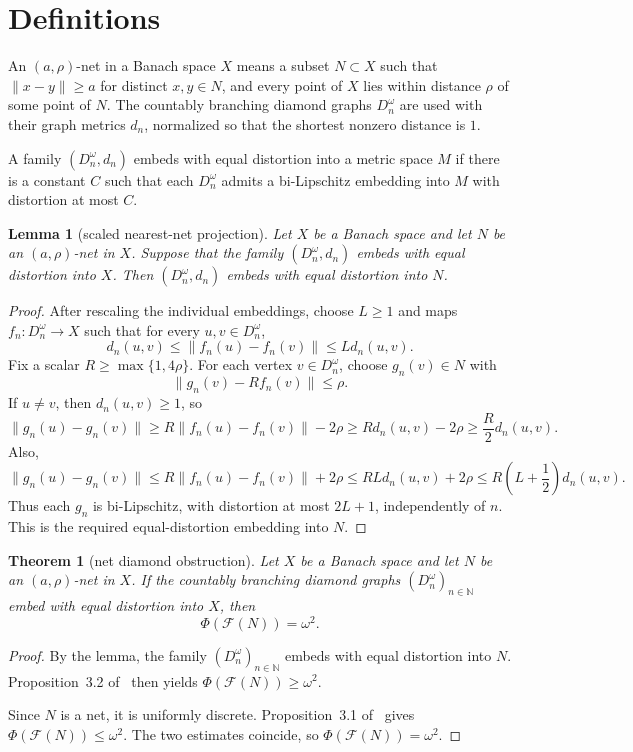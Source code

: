 \documentclass[11pt]{article}
\newtheorem{theorem}{Theorem}
\newtheorem{lemma}{Lemma}
\newcommand{\F}{\mathcal F}
\newcommand{\N}{\mathbb N}
\begin{document}
\section*{Definitions}

An $(a,\rho)$-net in a Banach space $X$ means a subset $N\subset X$ such that
$\|x-y\|\geq a$ for distinct $x,y\in N$, and every point of $X$ lies within
distance $\rho$ of some point of $N$.  The countably branching diamond graphs
$D_n^\omega$ are used with their graph metrics $d_n$, normalized so that the
shortest nonzero distance is $1$.

A family $(D_n^\omega,d_n)$ embeds with equal distortion into a metric space
$M$ if there is a constant $C$ such that each $D_n^\omega$ admits a
bi-Lipschitz embedding into $M$ with distortion at most $C$.

\begin{lemma}[scaled nearest-net projection]
Let $X$ be a Banach space and let $N$ be an $(a,\rho)$-net in $X$.  Suppose
that the family $(D_n^\omega,d_n)$ embeds with equal distortion into $X$.
Then $(D_n^\omega,d_n)$ embeds with equal distortion into $N$.
\end{lemma}

\begin{proof}
After rescaling the individual embeddings, choose $L\geq 1$ and maps
$f_n:D_n^\omega\to X$ such that for every $u,v\in D_n^\omega$,
\[
        d_n(u,v)\leq \|f_n(u)-f_n(v)\|\leq Ld_n(u,v).
\]
Fix a scalar $R\geq \max\{1,4\rho\}$.  For each vertex $v\in D_n^\omega$,
choose $g_n(v)\in N$ with
\[
        \|g_n(v)-R f_n(v)\|\leq \rho .
\]
If $u\neq v$, then $d_n(u,v)\geq 1$, so
\[
 \|g_n(u)-g_n(v)\|
 \geq R\|f_n(u)-f_n(v)\|-2\rho
 \geq Rd_n(u,v)-2\rho
 \geq \frac R2 d_n(u,v).
\]
Also,
\[
 \|g_n(u)-g_n(v)\|
 \leq R\|f_n(u)-f_n(v)\|+2\rho
 \leq RLd_n(u,v)+2\rho
 \leq R\left(L+\frac12\right)d_n(u,v).
\]
Thus each $g_n$ is bi-Lipschitz, with distortion at most $2L+1$,
independently of $n$.  This is the required equal-distortion embedding into
$N$.
\end{proof}

\begin{theorem}[net diamond obstruction]
Let $X$ be a Banach space and let $N$ be an $(a,\rho)$-net in $X$.  If the
countably branching diamond graphs $(D_n^\omega)_{n\in\N}$ embed with equal
distortion into $X$, then
\[
        \Phi(\F(N))=\omega^2 .
\]
\end{theorem}

\begin{proof}
By the lemma, the family $(D_n^\omega)_{n\in\N}$ embeds with equal distortion
into $N$.  Proposition~3.2 of~\cite{BLP} then yields
$\Phi(\F(N))\geq \omega^2$.

Since $N$ is a net, it is uniformly discrete.  Proposition~3.1 of~\cite{BLP}
gives $\Phi(\F(N))\leq \omega^2$.  The two estimates coincide, so
$\Phi(\F(N))=\omega^2$.
\end{proof}
\end{document}
